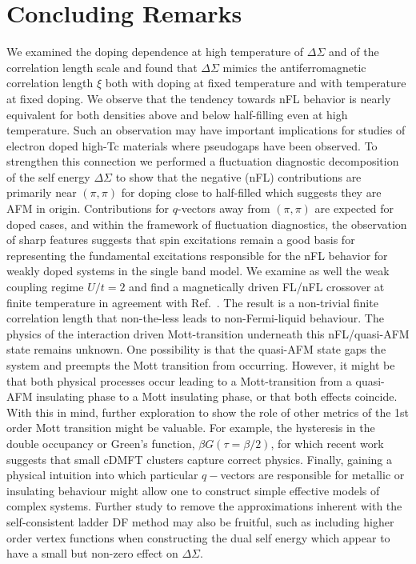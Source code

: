 \documentclass[twocolumn,notitlepage,prb,superscriptaddress,showpacs]{revtex4-1}
\begin{document}
\section{Concluding Remarks \label{sec:conclusions}} 

 We examined the doping dependence at high temperature of $\Delta \Sigma$ and of the correlation length scale and found that $\Delta \Sigma$ mimics the antiferromagnetic correlation length $\xi$ both with doping at fixed temperature and with temperature at fixed doping.  We observe that the tendency towards nFL behavior is nearly equivalent for both densities above and below half-filling even at high temperature.  Such an observation may have important implications for studies of electron doped high-Tc materials where pseudogaps have been observed.\cite{yamada:2005,damascelli:2018}
To strengthen this connection we performed a fluctuation diagnostic decomposition of the self energy $\Delta \Sigma$ to show that the negative (nFL) contributions are primarily near $(\pi,\pi)$ for doping close to half-filled which suggests they are AFM in origin.  Contributions for $q$-vectors away from $(\pi,\pi)$ are expected for doped cases, and within the framework of fluctuation diagnostics, the observation of sharp features suggests that spin excitations remain a good basis for representing the fundamental excitations responsible for the nFL behavior for weakly doped systems in the single band model.\cite{gunnarsson:2015}
 We examine as well the weak coupling regime $U/t=2$ and find a magnetically driven FL/nFL crossover  at finite temperature in agreement with Ref.~.
The result is a non-trivial finite correlation length that non-the-less leads to non-Fermi-liquid behaviour.   The physics of the interaction driven Mott-transition underneath this nFL/quasi-AFM state remains unknown.
One possibility is that the quasi-AFM state gaps the system and preempts the Mott transition from occurring.  However, it might be that both physical processes occur leading to a Mott-transition from a quasi-AFM insulating phase to a Mott insulating phase, or that both effects coincide. 
With this in mind, further exploration to show the role of other metrics of the 1st order Mott transition might be valuable.  For example, the hysteresis in the double occupancy or Green's function, $\beta G(\tau=\beta/2)$, for which recent work suggests that small cDMFT clusters capture correct physics.\cite{vanloon:2018:hysteresis,park:2008}   
Finally, gaining a physical intuition into which particular $q-$vectors are responsible for metallic or insulating behaviour might allow one to construct simple effective models of complex systems.  Further study to remove the approximations inherent with the self-consistent ladder DF method may also be fruitful, such as including higher order vertex functions when constructing the dual self energy which appear to have a small but non-zero effect on $\Delta \Sigma$.\cite{ribic:2017}
\end{document}
